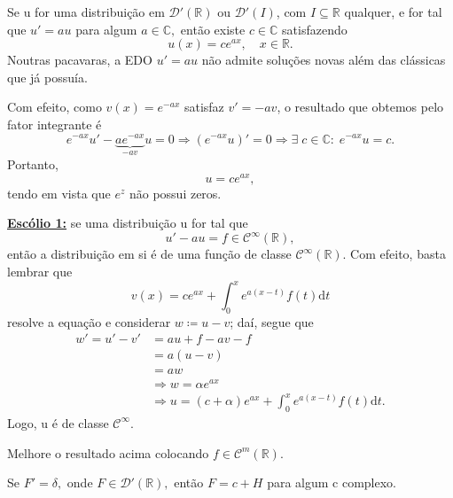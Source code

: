 \documentclass[../distribution_theory_notes.tex]{subfiles}
\begin{document}
 \begin{crl*}
   Se u for uma distribuição em \(\mathcal{D}'(\mathbb{R})\) ou \(\mathcal{D}'(I)\), com \(I\subseteq \mathbb{R}\) qualquer, e for tal que \(u'= au\) para algum \(a\in \mathbb{C},\) então existe \(c\in \mathbb{C}\) satisfazendo 
     \[
       u(x)=ce^{ax},\quad x\in \mathbb{R}.
     \]
     Noutras pacavaras, a EDO \(u'= au\) não admite soluções novas além das clássicas que já possuía. 
 \end{crl*}
 \begin{proof*}
   Com efeito, como \(v(x)=e^{-ax}\) satisfaz \(v'= - av\), o resultado que obtemos pelo fator integrante é 
     \[
       e^{-ax}u' - \underbrace{a e^{-ax}}_{-av}u = 0 \Rightarrow (e^{-ax}u)'=0 \Rightarrow \exists\; c\in \mathbb{C}:\; e^{-ax}u = c.
     \]
     Portanto, 
       \[
         u = c e^{ax},
       \]
       tendo em vista que \(e^{z}\) não possui zeros. \qedsymbol
 \end{proof*}
 
 \textbf{\underline{Escólio 1:}} se uma distribuição u for tal que 
   \[
     u'-au= f\in \mathcal{C}^{\infty}(\mathbb{R}),
   \]
   então a distribuição em si é de uma função de classe \(\mathcal{C}^{\infty}(\mathbb{R})\). Com efeito, basta lembrar que 
     \[
       v(x)=ce^{ax} + \int_{0}^{x}e^{a(x-t)}f(t) \mathrm{d}t 
     \]
     resolve a equação e considerar \(w\coloneqq u-v\); daí, segue que 
    \begin{align*}
      w'= u'-v' &= au + f - av - f \\ 
                &= a(u-v)\\ 
                &= aw \\ 
                &\Rightarrow w=\alpha e^{ax}\\ 
                &\Rightarrow u = (c+\alpha )e^{ax} + \int_{0}^{x}e^{a(x-t)}f(t) \mathrm{d}t.   
    \end{align*}
    Logo, u é de classe \(\mathcal{C}^{\infty}.\)
   \begin{exr}
     Melhore o resultado acima colocando \(f\in \mathcal{C}^{m}(\mathbb{R}).\)
   \end{exr}

     \begin{tcolorbox}[
     skin=enhanced,
     title=Observação,
     fonttitle=\bfseries,
   colframe=black,
     colbacktitle=cyan!75!white, 
     colback=cyan!15,
     colbacklower=black,
   coltitle=black,
     drop fuzzy shadow,
     ]
     Se \(F'= \delta ,\) onde \(F\in \mathcal{D}'(\mathbb{R}),\) então \(F=c+H\) para algum c complexo.
     \end{tcolorbox}
\end{document}
